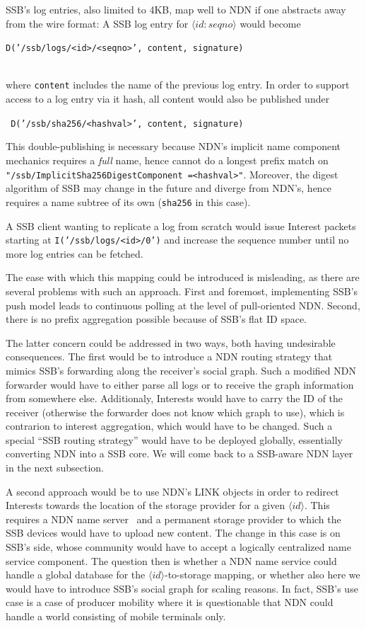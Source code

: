 \documentclass[10pt,sigconf]{acmart}
\begin{document}
SSB's log entries, also limited to 4KB, map well to NDN if one
abstracts away from the wire format: A SSB
log entry for \mbox{$\langle id:seqno\rangle$} would become\\
  \centerline{\tt D('/ssb/logs/<id>/<seqno>', content, signature)} \\
where {\tt content} includes the name of the previous log entry.
In order to support access to a log entry via it hash, all content
would also be published under\\
\centerline{\tt
  D('/ssb/sha256/<hashval>', content, signature)}

\noindent
This double-publishing is necessary because NDN's implicit name
component mechanics requires a {\em full} name, hence cannot do a longest
prefix match on {\tt
  "/ssb/ImplicitSha256DigestComponent =<hashval>"}. Moreover, the digest
algorithm of SSB may change in the future and diverge from NDN's, hence
requires a name subtree of its own ({\tt sha256} in this case).

A SSB client wanting to replicate a log from scratch would issue
Interest packets starting at {\tt I('/ssb/logs/<id>/0')} and increase the
sequence number until no more log entries can be fetched.

The ease with which this mapping could be introduced is misleading, as
there are several problems with such an approach. First and foremost,
implementing SSB's push model leads to continuous polling at the level
of pull-oriented NDN. Second, there is no prefix aggregation possible
because of SSB's flat ID space.

The latter concern could be addressed in two ways, both having
undesirable consequences. The first would be to introduce a NDN
routing strategy that mimics SSB's forwarding along the receiver's
social graph. Such a modified NDN forwarder would have to either parse
all logs or to receive the graph information from somewhere
else. Additionaly, Interests would have to carry the ID of the
receiver (otherwise the forwarder does not know which graph to use),
which is contrarion to interest aggregation, which would have to be
changed.  Such a special ``SSB routing strategy'' would have to be
deployed globally, essentially converting NDN into a SSB core. We will
come back to a SSB-aware NDN layer in the next subsection.

A second approach would be to use NDN's LINK objects in order to redirect
Interests towards the location of the storage provider for a given
$\langle id\rangle$. This requires a NDN name server~\cite{NDNS} and a
permanent storage provider to which the SSB devices would
have to upload new content. The change in this case is on SSB's side,
whose community would have to accept a logically centralized name
service component. The question then is whether a NDN name service
could handle a global database for the $\langle id\rangle$-to-storage
mapping, or whether also here we would have to introduce SSB's social
graph for scaling reasons. In fact, SSB's use case is a case of
producer mobility where it is questionable that NDN could handle a
world consisting of mobile terminals only.
\end{document}
